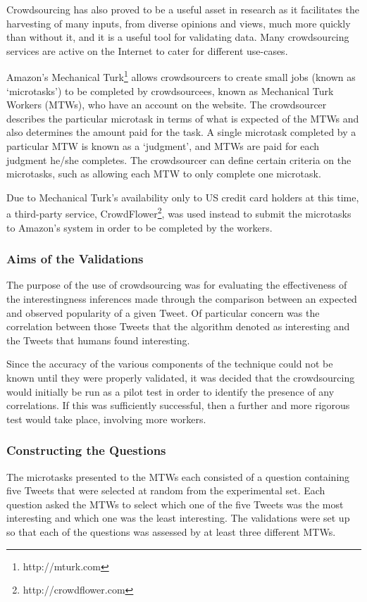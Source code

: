 Crowdsourcing has also proved to be a useful asset in research as it facilitates the harvesting of many inputs, from diverse opinions and views, much more quickly than without it, and it is a useful tool for validating data. Many crowdsourcing services are active on the Internet to cater for different use-cases.

Amazon's Mechanical Turk\footnote{http://mturk.com} allows crowdsourcers to create small jobs (known as `microtasks') to be completed by crowdsourcees, known as Mechanical Turk Workers (MTWs), who have an account on the website. The crowdsourcer describes the particular microtask in terms of what is expected of the MTWs and also determines the amount paid for the task. A single microtask completed by a particular MTW is known as a `judgment', and MTWs are paid for each judgment he/she completes. The crowdsourcer can define certain criteria on the microtasks, such as allowing each MTW to only complete one microtask.

Due to Mechanical Turk's availability only to US credit card holders at this time, a third-party service, CrowdFlower\footnote{http://crowdflower.com}, was used instead to submit the microtasks to Amazon's system in order to be completed by the workers. 



\subsubsection{Aims of the Validations}
The purpose of the use of crowdsourcing was for evaluating the effectiveness of the interestingness inferences made through the comparison between an expected and observed popularity of a given Tweet. Of particular concern was the correlation between those Tweets that the algorithm denoted as interesting and the Tweets that humans found interesting.

Since the accuracy of the various components of the technique could not be known until they were properly validated, it was decided that the crowdsourcing would initially be run as a pilot test in order to identify the presence of any correlations. If this was sufficiently successful, then a further and more rigorous test would take place, involving more workers.


\subsubsection{Constructing the Questions}
The microtasks presented to the MTWs each consisted of a question containing five Tweets that were selected at random from the experimental set. Each question asked the MTWs to select which one of the five Tweets was the most interesting and which one was the least interesting. The validations were set up so that each of the questions was assessed by at least three different MTWs.

